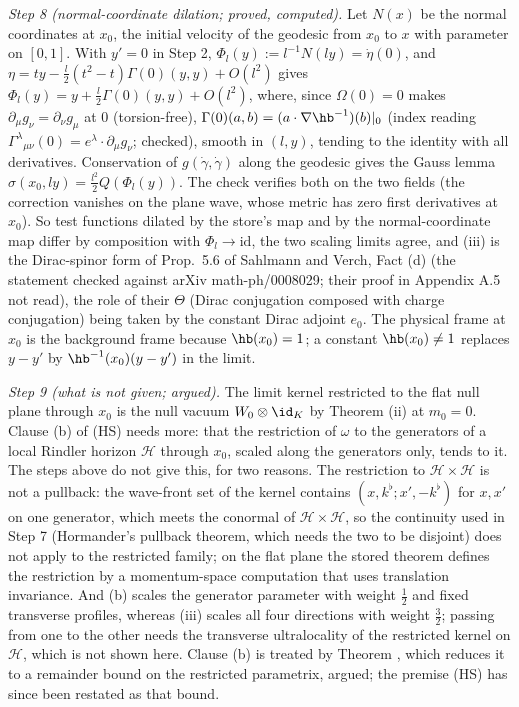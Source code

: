 \emph{Step 8 (normal-coordinate dilation; proved, computed).} Let $N(x)$ be the normal coordinates at $x_{0}$, the initial velocity of the geodesic from $x_{0}$ to $x$ with parameter on $[0, 1]$. With $y' = 0$ in Step 2, $\Phi_{l}(y) := l^{-1}N(ly) = \dot\eta(0)$, and $\eta = ty - \tfrac{l}{2}(t^{2} - t)\Gamma(0)(y, y) + O(l^{2})$ gives $\Phi_{l}(y) = y + \tfrac{l}{2}\Gamma(0)(y, y) + O(l^{2})$, where, since $\Omega(0) = 0$ makes $\partial_{\mu}g_{\nu} = \partial_{\nu}g_{\mu}$ at $0$ (torsion-free), $\Gamma(0)(a, b) = (a\cdot\nabla\hb^{-1})(b)|_{0}$ (index reading $\Gamma^{\lambda}{}_{\mu\nu}(0) = e^{\lambda}\cdot\partial_{\mu}g_{\nu}$; checked), smooth in $(l, y)$, tending to the identity with all derivatives. Conservation of $g(\dot\gamma, \dot\gamma)$ along the geodesic gives the Gauss lemma $\sigma(x_{0}, ly) = \tfrac{l^{2}}{2}Q(\Phi_{l}(y))$. The check verifies both on the two fields (the correction vanishes on the plane wave, whose metric has zero first derivatives at $x_{0}$). So test functions dilated by the store's map and by the normal-coordinate map differ by composition with $\Phi_{l} \to \mathrm{id}$, the two scaling limits agree, and (iii) is the Dirac-spinor form of Prop.~5.6 of Sahlmann and Verch, Fact (d) (the statement checked against arXiv math-ph/0008029; their proof in Appendix A.5 not read), the role of their $\Theta$ (Dirac conjugation composed with charge conjugation) being taken by the constant Dirac adjoint $e_{0}$. The physical frame at $x_{0}$ is the background frame because $\hb(x_{0}) = 1$; a constant $\hb(x_{0}) \ne 1$ replaces $y - y'$ by $\hb^{-1}(x_{0})(y - y')$ in the limit.

\emph{Step 9 (what is not given; argued).} The limit kernel restricted to the flat null plane through $x_{0}$ is the null vacuum $W_{0}\otimes\id_{K}$ by Theorem (ii) at $m_{0} = 0$. Clause (b) of (HS) needs more: that the restriction of $\omega$ to the generators of a local Rindler horizon $\mathcal{H}$ through $x_{0}$, scaled along the generators only, tends to it. The steps above do not give this, for two reasons. The restriction to $\mathcal{H}\times\mathcal{H}$ is not a pullback: the wave-front set of the kernel contains $(x, k^{\flat}; x', -k^{\flat})$ for $x, x'$ on one generator, which meets the conormal of $\mathcal{H}\times\mathcal{H}$, so the continuity used in Step 7 (Hormander's pullback theorem, which needs the two to be disjoint) does not apply to the restricted family; on the flat plane the stored theorem defines the restriction by a momentum-space computation that uses translation invariance. And (b) scales the generator parameter with weight $\tfrac12$ and fixed transverse profiles, whereas (iii) scales all four directions with weight $\tfrac32$; passing from one to the other needs the transverse ultralocality of the restricted kernel on $\mathcal{H}$, which is not shown here. Clause (b) is treated by Theorem , which reduces it to a remainder bound on the restricted parametrix, argued; the premise (HS) has since been restated as that bound.
